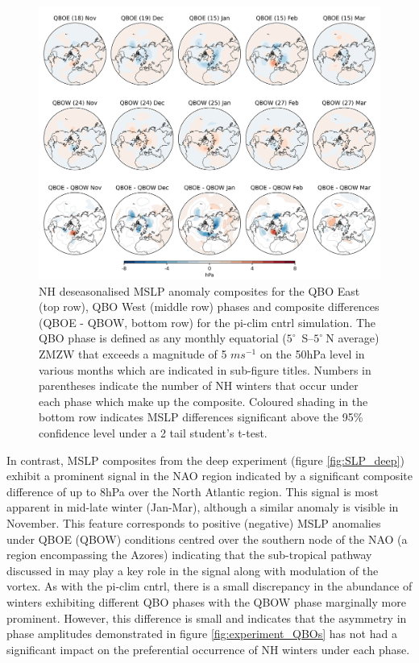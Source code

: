 \begin{figure}[h!]
\begin{center}
\noindent\includegraphics[width =0.8\linewidth]{Figures/Figures-deepQBO/SLP_composites_individual_months_QBO_phases_U_piclim_30hPa_5thresh.png}
\caption[MSLP composites under different QBO phases in the pi-clim cntrl simulation]{NH deseasonalised MSLP anomaly composites for the QBO East (top row), QBO West (middle row) phases and composite differences (QBOE - QBOW, bottom row) for the pi-clim cntrl simulation. The QBO phase is defined as any monthly equatorial ($5^{\circ}$\ S--$5^{\circ}\ $N average) ZMZW that exceeds a magnitude of 5 $ms^{-1}$ on the 50hPa level in various months which are indicated in sub-figure titles. Numbers in parentheses indicate the number of NH winters that occur under each phase which make up the composite. Coloured shading in the bottom row indicates MSLP differences significant above the 95\% confidence level under a 2 tail student’s t-test.}
\label{fig:SLP_piclim}
\end{center}
\end{figure}

In contrast, MSLP composites from the deep experiment (figure \ref{fig:SLP_deep}) exhibit a prominent signal in the NAO region indicated by a significant composite difference of up to 8hPa over the North Atlantic region. This signal is most apparent in mid-late winter (Jan-Mar), although a similar anomaly is visible in November. This feature corresponds to positive (negative) MSLP anomalies under QBOE (QBOW) conditions centred over the southern node of the NAO (a region encompassing the Azores) indicating that the sub-tropical pathway discussed in \cite{graySurface2018b} may play a key role in the signal along with modulation of the vortex. As with the pi-clim cntrl, there is a small discrepancy in the abundance of winters exhibiting different QBO phases with the QBOW phase marginally more prominent. However, this difference is small and indicates that the asymmetry in phase amplitudes demonstrated in figure \ref{fig:experiment_QBOs} has not had a significant impact on the preferential occurrence of NH winters under each phase.

